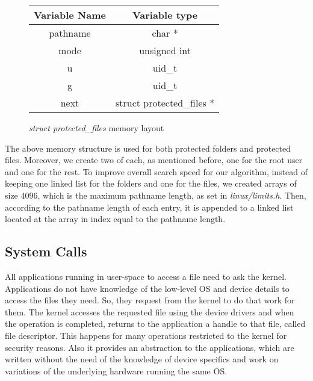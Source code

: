 \begin{figure}[ht]
	\centering
	\begin{tabular}{|c|c|}
		\hline
		\textbf{Variable Name} & \textbf{Variable type} \\
		\hline
		pathname & char * \\
		\hline
		mode & unsigned int \\
		\hline
		u & uid\_t \\
		\hline
		g & uid\_t \\
		\hline
		next & struct protected\_files * \\
		\hline
	\end{tabular}
	\caption{\textit{struct protected\_files} memory layout}
	\label{fig:sacl}
\end{figure}

\par The above memory structure is used for both protected folders and protected files. Moreover, we create two of each, as mentioned before, one for the root user and one for the rest. To improve overall search speed for our algorithm, instead of keeping one linked list for the folders and one for the files, we created arrays of size 4096, which is the maximum pathname length, as set in \textit{linux/limits.h}. Then, according to the pathname length of each entry, it is appended to a linked list located at the array in index equal to the pathname length.

\subsection{System Calls}\label{sub:syscalls}
All applications running in user-space to access a file need to ask the kernel. Applications do not have knowledge of the low-level \ac{OS} and device details to access the files they need. So, they request from the kernel to do that work for them. The kernel accesses the requested file using the device drivers and when the operation is completed, returns to the application a handle to that file, called file descriptor. This happens for many operations restricted to the kernel for security reasons. Also it provides an abstraction to the applications, which are written without the need of the knowledge of device specifics and work on variations of the underlying hardware running the same \ac{OS}. 


